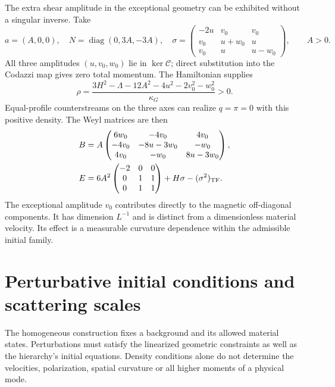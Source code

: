 The extra shear amplitude in the exceptional geometry can be exhibited without a singular inverse. Take
\begin{equation}
 a=(A,0,0),\quad N=\operatorname{diag}(0,3A,-3A),\quad
 \sigma=\begin{pmatrix}
 -2u&v_0&v_0\\v_0&u+w_0&u\\v_0&u&u-w_0
 \end{pmatrix},\qquad A>0.
 \label{geo:exceptional_family}
\end{equation}
All three amplitudes $(u,v_0,w_0)$ lie in $\ker\mathcal C$; direct substitution into the Codazzi map gives zero total momentum. The Hamiltonian supplies
\begin{equation}
 \rho=\frac{3H^2-\Lambda-12A^2-4u^2-2v_0^2-w_0^2}{\kappa_G}>0.
 \label{geo:exceptional_density}
\end{equation}
Equal-profile counterstreams on the three axes can realize $q=\pi=0$ with this positive density. The Weyl matrices are then
\begin{align}
 B&=A\begin{pmatrix}
 6w_0&-4v_0&4v_0\\
 -4v_0&-8u-3w_0&-w_0\\
 4v_0&-w_0&8u-3w_0
 \end{pmatrix},\nonumber\\
 E&=6A^2\begin{pmatrix}-2&0&0\\0&1&1\\0&1&1\end{pmatrix}
                         +H\sigma-(\sigma^2)_{\rm TF}.
 \label{geo:exceptional_weyl}
\end{align}
The exceptional amplitude $v_0$ contributes directly to the magnetic off-diagonal components. It has dimension $L^{-1}$ and is distinct from a dimensionless material velocity. Its effect is a measurable curvature dependence within the admissible initial family.


\section{Perturbative initial conditions and scattering scales}
\label{geo:perturbative_initial}
The homogeneous construction fixes a background and its allowed material states. Perturbations must satisfy the linearized geometric constraints as well as the hierarchy's initial equations. Density conditions alone do not determine the velocities, polarization, spatial curvature or all higher moments of a physical mode.

